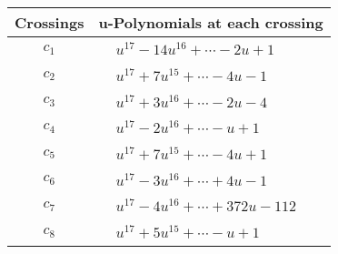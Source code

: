 \documentclass[1p]{elsarticle_modified}
\theoremstyle{definition}
\begin{document}
\begin{tabular}{m{50pt}|m{274pt}}
Crossings & \hspace{64pt}u-Polynomials at each crossing \\
\hline $$\begin{aligned}c_{1}\end{aligned}$$&$\begin{aligned}
&u^{17}-14 u^{16}+\cdots-2 u+1
\end{aligned}$\\
\hline $$\begin{aligned}c_{2}\end{aligned}$$&$\begin{aligned}
&u^{17}+7 u^{15}+\cdots-4 u-1
\end{aligned}$\\
\hline $$\begin{aligned}c_{3}\end{aligned}$$&$\begin{aligned}
&u^{17}+3 u^{16}+\cdots-2 u-4
\end{aligned}$\\
\hline $$\begin{aligned}c_{4}\end{aligned}$$&$\begin{aligned}
&u^{17}-2 u^{16}+\cdots- u+1
\end{aligned}$\\
\hline $$\begin{aligned}c_{5}\end{aligned}$$&$\begin{aligned}
&u^{17}+7 u^{15}+\cdots-4 u+1
\end{aligned}$\\
\hline $$\begin{aligned}c_{6}\end{aligned}$$&$\begin{aligned}
&u^{17}-3 u^{16}+\cdots+4 u-1
\end{aligned}$\\
\hline $$\begin{aligned}c_{7}\end{aligned}$$&$\begin{aligned}
&u^{17}-4 u^{16}+\cdots+372 u-112
\end{aligned}$\\
\hline $$\begin{aligned}c_{8}\end{aligned}$$&$\begin{aligned}
&u^{17}+5 u^{15}+\cdots- u+1
\end{aligned}$\\

\end{tabular}
\end{document}
